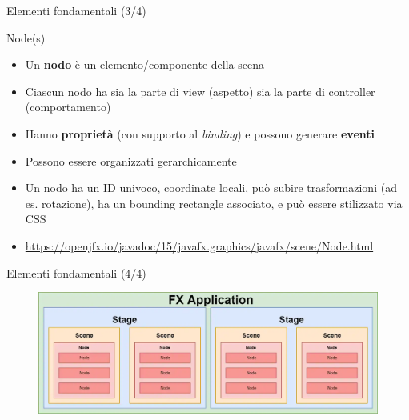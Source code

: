 \documentclass[xcolor=dvipsnames,presentation]{beamer}
\begin{document}
\begin{frame} {Elementi fondamentali (3/4)}
\begin{block}{Node(s)}
\begin{itemize}
\item Un \textbf{nodo} è un elemento/componente della scena
\item Ciascun nodo ha sia la parte di view (aspetto) sia la parte di controller (comportamento)
\item Hanno \textbf{proprietà} (con supporto al \emph{binding}) e possono generare \textbf{eventi}
\item Possono essere organizzati gerarchicamente
\item Un nodo ha un ID univoco, coordinate locali, può subire trasformazioni (ad es. rotazione), ha un bounding rectangle associato, e può essere stilizzato via CSS
\item \url{https://openjfx.io/javadoc/15/javafx.graphics/javafx/scene/Node.html}
\end{itemize}
\end{block}
\end{frame}

\begin{frame}{Elementi fondamentali (4/4)}
\begin{figure}
\includegraphics[width=\textwidth]{img/javafx-app.png}
\end{figure}
\end{frame}

%
\end{document}
